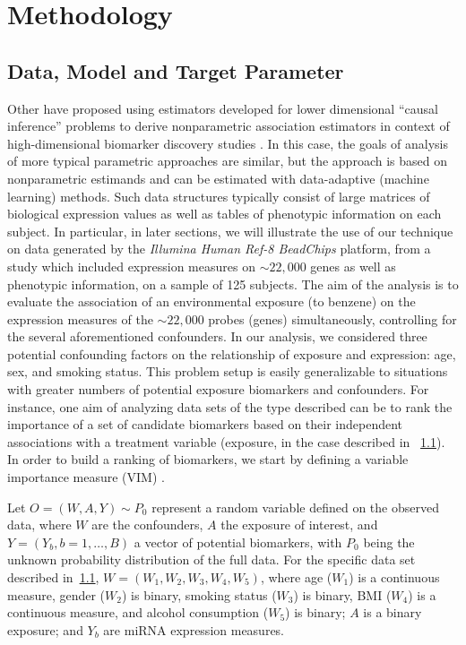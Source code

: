 \chapter{Methodology}

\section{Data, Model and Target Parameter}\label{data}

Other have proposed using estimators developed for lower dimensional ``causal
inference'' problems to derive nonparametric association estimators in context
of high-dimensional biomarker discovery studies \cite{tuglus2011targeted}. In
this case, the goals of analysis of more typical parametric approaches are
similar, but the approach is based on nonparametric estimands and can be
estimated with data-adaptive (machine learning) methods. Such data structures
typically consist of large matrices of biological expression values as well as
tables of phenotypic information on each subject. In particular, in later
sections, we will illustrate the use of our technique on data generated by the
\textit{Illumina Human Ref-8 BeadChips} platform, from a study which included
expression measures on $\sim 22,000$ genes as well as phenotypic information, on
a sample of 125 subjects. The aim of the analysis is to evaluate the association
of an environmental exposure (to benzene) on the expression measures of the
$\sim 22,000$ probes (genes) simultaneously, controlling for the several
aforementioned confounders. In our analysis, we considered three potential
confounding factors on the relationship of exposure and expression: age, sex,
and smoking status. This problem setup is easily generalizable to situations
with greater numbers of potential exposure biomarkers and confounders. For
instance, one  aim of analyzing data sets of the type described can be to rank
the importance of a set of candidate biomarkers based on their independent
associations with a treatment variable (exposure, in the case described in
~\ref{data}). In order to build a ranking of biomarkers, we start by defining a
variable importance measure (VIM) \cite{van2011targeted}.

Let $O = (W, A, Y) \sim P_{0}$ represent a random variable defined on the
observed data, where $W$ are the confounders, $A$ the exposure of interest,
and $Y=(Y_b, b = 1, \dots, B)$ a vector of potential biomarkers, with $P_{0}$
being the unknown probability distribution of the full data. For the specific
data set described in~\ref{data}, $W = (W_{1}, W_{2}, W_{3}, W_{4}, W_{5})$,
where age ($W_{1}$) is a continuous measure, gender ($W_{2}$) is binary,
smoking status ($W_{3}$) is binary, BMI ($W_{4}$) is a continuous measure, and
alcohol consumption ($W_{5}$) is binary; $A$ is a binary exposure; and $Y_{b}$
are miRNA expression measures.

